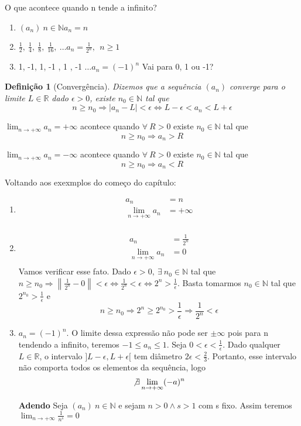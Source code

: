 \documentclass[12pt,openany, letterpaper]{book}
\newtheorem{definition}{Definição}[section]
\begin{document}
O que acontece quando n tende a infinito?

\begin{enumerate}
\item $(a_n) \ n \in \mathds{N} a_n = n$
\item $\frac{1}{2}, \ \frac{1}{4}, \ \frac{1}{8}, \ \frac{1}{16}, \ \hdots a_n = \frac{1}{2^n}, \ \  n\geq 1 $
\item 1, -1, 1, -1 , 1 , -1 $\hdots a_n = (-1)^n $ Vai para 0, 1 ou -1?
\end{enumerate}
\begin{definition}[Convergência]
Dizemos que a sequência $(a_n)$ converge para o limite $L \in \mathds{R}$ dado $\epsilon > 0$, existe $n_0 \in \mathds{N}$ tal que $$ n \geq n_0 \Rightarrow |a_n - L| < \epsilon \Longleftrightarrow L-\epsilon < a_n < L + \epsilon $$
\end{definition}

$\displaystyle{\lim_{n \rightarrow + \infty} a_n = + \infty} $ acontece quando $\forall \ R > 0 $ existe $n_0 \in \mathds{N} $ tal que $$n \geq n_0 \Rightarrow a_n > R$$

$\displaystyle{\lim_{n \rightarrow + \infty} a_n = - \infty} $ acontece quando $\forall \ R > 0 $ existe $n_0 \in \mathds{N} $ tal que $$n \geq n_0 \Rightarrow a_n < R$$

Voltando aos exexmplos do começo do capítulo:
\begin{enumerate}
\item \begin {align*} 
a_n &= n \\
\lim_{n \rightarrow + \infty} a_n &= + \infty\\
\end{align*}
\item \begin{align*}
a_n &= \frac{1}{2^n}\\
\lim_{n \rightarrow + \infty} a_n &= 0\\
\end{align*}
Vamos verificar esse fato. Dado $\epsilon > 0, \ \exists \ n_0 \in \mathds{N}$ tal que $\displaystyle{ n \geq n_0  \Rightarrow \left\| \frac{1}{2^n} - 0 \right\| <  \epsilon \Longleftrightarrow \frac{1}{2^n} < \epsilon \Longleftrightarrow 2^n > \frac{1}{\epsilon}}$.   Basta tomarmos $n_0 \in \mathds{N}$ tal que $\displaystyle{2^{n_0} > \frac{1}{\epsilon}}$ e $$ n \geq n_0 \Rightarrow 2^n \geq 2^{n_0} > \frac{1}{\epsilon} \Rightarrow \frac{1}{2^n} < \epsilon$$
\item $a_n = (-1)^n$. O limite dessa expressão não pode ser $\pm \infty$ pois para n tendendo a infinito, teremos $-1 \leq a_n \leq 1 $.  Seja $\displaystyle{0 < \epsilon < \frac{1}{\epsilon} } $. Dado qualquer $L \in \mathds{R}$, o intervalo $]L- \epsilon, L+ \epsilon[ $ tem diâmetro $\displaystyle{2\epsilon < \frac{2}{3}}$. 
Portanto, esse intervalo não comporta  todos os elementos da sequência, logo $$ \not \exists \lim_{n \rightarrow + \infty} (-a)^n$$
\item [\textbf{Adendo}] Seja $(a_n) \ n \in \mathds{N}$  e sejam $n > 0 \land s > 1$ com s fixo. Assim teremos $\displaystyle{\lim_{n \rightarrow + \infty} \frac{1}{n^s} = 0}$
\end{enumerate}
\end{document}
